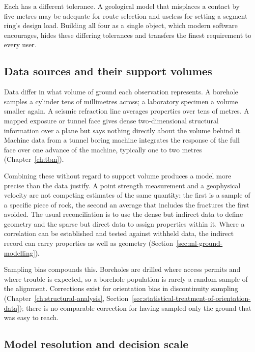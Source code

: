Each has a different tolerance. A geological model that misplaces a contact by
five metres may be adequate for route selection and useless for
setting a segment ring's design load. Building all four as a single object,
which modern software encourages, hides these differing tolerances and
transfers the finest requirement to every user.

\subsection{Data sources and their support volumes}
\label{sec:data-support}

Data differ in what volume of ground each observation represents. A borehole
samples a cylinder tens of millimetres across; a laboratory specimen a volume
smaller again. A seismic refraction line averages properties over tens of
metres. A mapped exposure or tunnel face gives dense two-dimensional structural
information over a plane but says nothing directly about the volume behind it.
Machine data from a tunnel boring machine integrates the response of the full
face over one advance of the machine, typically one to two metres
(Chapter~\ref{ch:tbm}).

Combining these without regard to support volume produces a model more precise
than the data justify. A point strength measurement and a geophysical
velocity are not competing estimates of the same quantity: the first is a
sample of a specific piece of rock, the second an average that includes the
fractures the first avoided. The usual reconciliation is to use the dense but
indirect data to define geometry and the sparse but direct data to assign
properties within it.
Where a correlation can be established and tested against withheld data, the
indirect record can carry properties as well as geometry
(Section~\ref{sec:ml-ground-modelling}).

Sampling bias compounds this. Boreholes are drilled where access permits and
where trouble is expected, so a borehole population is rarely a random sample
of the alignment. Corrections exist for orientation bias in discontinuity
sampling (Chapter~\ref{ch:structural-analysis}, Section~\ref{sec:statistical-treatment-of-orientation-data}); there is no comparable
correction for having sampled only the ground that was easy to reach.

\subsection{Model resolution and decision scale}
\label{sec:model-resolution}

